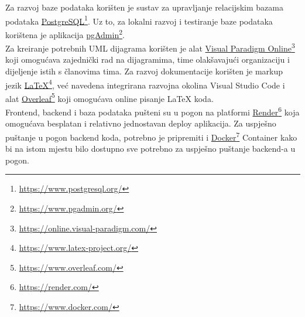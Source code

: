             Za razvoj baze podataka korišten je sustav za upravljanje relacijskim bazama podataka \underline{PostgreSQL}\footnote{\url{https://www.postgresql.org/}}. Uz to, za lokalni razvoj i testiranje baze podataka korištena je aplikacija \underline{pgAdmin}\footnote{\url{https://www.pgadmin.org/}}. \\

            Za kreiranje potrebnih UML dijagrama korišten je alat \underline{Visual Paradigm Online}\footnote{\url{https://online.visual-paradigm.com/}} koji omogućava zajednički rad na dijagramima, time olakšavajući organizaciju i dijeljenje istih s članovima tima. Za razvoj dokumentacije korišten je markup jezik \underline{LaTeX}\footnote{\url{https://www.latex-project.org/}}, već navedena integrirana razvojna okolina Visual Studio Code i alat \underline{Overleaf}\footnote{\url{https://www.overleaf.com/}} koji omogućava online pisanje LaTeX koda.\\

            Frontend, backend i baza podataka pušteni su u pogon na platformi \underline{Render}\footnote{\url{https://render.com/}} koja omogućava besplatan i relativno jednostavan deploy aplikacija. Za uspješno puštanje u pogon backend koda, potrebno je pripremiti i \underline{Docker}\footnote{\url{https://www.docker.com/}} Container kako bi na istom mjestu bilo dostupno sve potrebno za uspješno puštanje backend-a u pogon. \\
		
			\eject 
		
	
			
			
	
			
			
